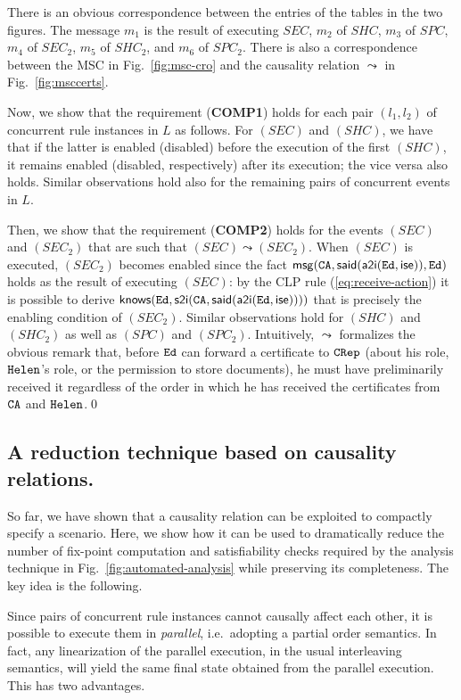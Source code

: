 \documentclass[conference]{llncs}
\newcommand{\theCA}{\ensuremath \mathtt{CA}}
\newcommand{\Ed}{\ensuremath \mathtt{Ed}}
\newcommand{\Helen}{\ensuremath \mathtt{Helen}}
\newcommand{\CRep}{\ensuremath \mathtt{CRep}}
\newcommand{\isemployee}{\ensuremath \mathsf{ise}}
\newcommand{\know}{\ensuremath \mathsf{knows}}
\newcommand{\msg}{\ensuremath \mathsf{msg}}
\newcommand{\atoi}{\ensuremath \mathsf{a2i}}
\newcommand{\stoi}{\ensuremath \mathsf{s2i}}
\newcommand{\said}{\ensuremath \mathsf{said}}
\begin{document}
{\begin{example}
There is an obvious correspondence between
the entries of the tables in the two figures. 
The message $m_1$ is the result of executing $SEC$, $m_2$ of $SHC$, $m_3$ of $SPC$, $m_4$
of $SEC_2$, $m_5$ of $SHC_2$, and $m_6$ of $SPC_2$.  There is also a
correspondence between the MSC in Fig.~\ref{fig:msc-cro} and the
causality relation $\leadsto$ in Fig.~\ref{fig:msccerts}.  

Now, we
show that the requirement (\textbf{COMP1}) holds for each pair $(l_1,l_2)$ of
concurrent rule instances in $L$ as follows.  For $(SEC)$ and $(SHC)$,
we have that if the latter is enabled (disabled) before the execution
of the first $(SHC)$, it remains enabled (disabled, respectively)
after its execution; the vice versa also holds.  Similar observations
hold also for the remaining pairs of concurrent events in $L$.  

Then, we show that the requirement (\textbf{COMP2}) holds for the events $(SEC)$ and
$(SEC_2)$ that are such that $(SEC)\leadsto (SEC_2)$.  
When $(SEC)$ is
executed, $(SEC_2)$ becomes enabled since the fact
$\msg(\theCA,\said(\atoi(\Ed,\isemployee)), \Ed)$ holds as the result
of executing $(SEC)$: by the CLP rule (\ref{eq:receive-action})
it is possible to derive $\know(\Ed,\stoi(\theCA, \said(\atoi(\Ed,\isemployee))))$
that is precisely the enabling condition of $(SEC_2)$.  Similar observations hold for
$(SHC)$ and $(SHC_2)$ as well as $(SPC)$ and $(SPC_2)$.  Intuitively,
$\leadsto$ formalizes the obvious remark that, before $\Ed$ can forward
a certificate to $\CRep$ (about his role, $\Helen$'s role, or the
permission to store documents), he must have preliminarily received it
regardless of the order in which he has received the certificates from
$\theCA$ and $\Helen$.\qed
\end{example}

\subsection{A reduction technique based on causality relations.} 

So far, we have shown that a causality relation can be exploited to compactly
specify a scenario. Here, we show how it can be used to dramatically
reduce the number of fix-point computation and satisfiability checks
required by the analysis technique in
Fig.~\ref{fig:automated-analysis} while preserving its
completeness. The key idea is the following. 

Since pairs of concurrent
rule instances cannot causally affect each other, it is possible to
execute them in \emph{parallel}, i.e.\ adopting a partial order
semantics. In fact, any linearization of the parallel execution, in
the usual interleaving semantics, will yield the same final state
obtained from the parallel execution. This has two advantages. 

}
\end{document}
